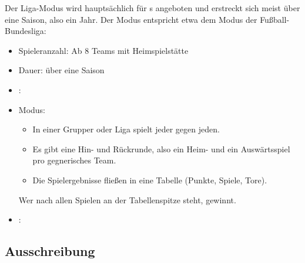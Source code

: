 Der Liga-Modus wird hauptsächlich für s angeboten und erstreckt sich meist über eine Saison, also ein Jahr. Der Modus entspricht etwa dem Modus der Fußball-Bundesliga: 
\begin{itemize}
\item Spieleranzahl: Ab 8 Teams mit Heimspielstätte
\item Dauer: über eine Saison
\item {}:  
\item Modus: 
\begin{itemize}
\item In einer Grupper oder Liga spielt jeder gegen jeden.
\item Es gibt eine Hin- und Rückrunde, also ein Heim- und ein Auswärtsspiel pro gegnerisches Team.
\item Die Spielergebnisse fließen in eine Tabelle (Punkte, Spiele, Tore). 
\end{itemize}
Wer nach allen Spielen an der Tabellenspitze steht, gewinnt. 
\item {}:
\end{itemize}



\subsection{Ausschreibung}
\label{turniere:vorbereitung:ausschreibung}


